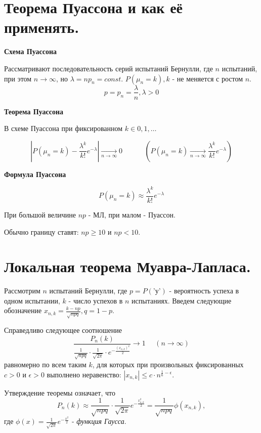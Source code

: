 \section{Теорема Пуассона и как её применять.}

\noindent \textbf{Схема Пуассона}

Рассматривают последовательность серий испытаний Бернулли, где $n$ испытаний, при этом $n \to \infty$, но $\lambda = n p_n = const$. $P(\mu_n = k), k$ - не меняется с ростом $n$.
\[ p = p_n = \dfrac{\lambda}{n}, \lambda > 0 \]

\noindent \textbf{Теорема Пуассона}

В схеме Пуассона при фиксированном $k \in 0,1, \dots$

\[ \left| P(\mu_n = k) - \dfrac{\lambda^k}{k!}e^{-\lambda} \right| \underset{n \to \infty}{\to} 0 ~~~~~~~~~~~~~~ \left( P(\mu_n = k)\underset{n \to \infty}{\to} \dfrac{\lambda^k}{k!}e^{- \lambda} \right) \]

\noindent \textbf{Формула Пуассона}

\[ P(\mu_n = k) \approx \dfrac{\lambda^k}{k!}e^{-\lambda} \]

\begin{remark}
	При большой величине $np$ - МЛ, при малом - Пуассон.
	
	Обычно границу ставят: $np \ge 10$ и $np < 10$.
\end{remark}

\section{Локальная теорема Муавра-Лапласа.}

Рассмотрим $n$ испытаний Бернулли, где $p = P(\text{'у'})$ - вероятность успеха в одном испытании, $k$ - число успехов в $n$ испытаниях. Введем следующие обозначение $x_{n, k} = \frac{k - np}{\sqrt{npq}}, q = 1 - p$.

Справедливо следующее соотношение
\[ \dfrac{P_n(k)}{\frac{1}{\sqrt{npq}} \cdot \frac{1}{\sqrt{2 \pi}} \cdot e^{- \frac{(x_{n, k})^2}{2}}} \to 1 ~~~~~~ (n \to \infty) \]
равномерно по всем таким $k$, для которых при произвольных фиксированных $c > 0$ и $\epsilon > 0$ выполнено неравенство: $|x_{n, k}| \le c \cdot n^{\frac{1}{6} - \epsilon}$.

Утверждение теоремы означает, что
\[ P_n(k) \approx \frac{1}{\sqrt{npq}} \cdot \frac{1}{\sqrt{2 \pi}} e^{-\frac{x_{n,k}^2}{2}} = \frac{1}{\sqrt{npq}} \phi (x_{n, k}), \]
где $\phi(x) = \frac{1}{\sqrt{2 \pi}} e^{- \frac{x^2}{2}}$ - \textit{функция Гаусса}.

